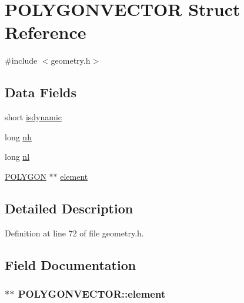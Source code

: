 \hypertarget{struct_p_o_l_y_g_o_n_v_e_c_t_o_r}{\section{P\-O\-L\-Y\-G\-O\-N\-V\-E\-C\-T\-O\-R Struct Reference}
\label{struct_p_o_l_y_g_o_n_v_e_c_t_o_r}
}


{\ttfamily \#include $<$geometry.\-h$>$}

\subsection*{Data Fields}
\begin{DoxyCompactItemize}
\item 
short \hyperlink{struct_p_o_l_y_g_o_n_v_e_c_t_o_r_a842dd05298147797db035306ce3c2424}{isdynamic}
\item 
long \hyperlink{struct_p_o_l_y_g_o_n_v_e_c_t_o_r_a13be69b5d64ab9b144901f202d9b0eb9}{nh}
\item 
long \hyperlink{struct_p_o_l_y_g_o_n_v_e_c_t_o_r_a95c31cf4ec12ed9f55ea0a6f38794bb6}{nl}
\item 
\hyperlink{struct_p_o_l_y_g_o_n}{P\-O\-L\-Y\-G\-O\-N} $\ast$$\ast$ \hyperlink{struct_p_o_l_y_g_o_n_v_e_c_t_o_r_aad9952a67bb6d320fe197a442ce362f5}{element}
\end{DoxyCompactItemize}


\subsection{Detailed Description}


Definition at line 72 of file geometry.\-h.



\subsection{Field Documentation}
\hypertarget{struct_p_o_l_y_g_o_n_v_e_c_t_o_r_aad9952a67bb6d320fe197a442ce362f5}{
\subsubsection[{element}]{$\ast$$\ast$ P\-O\-L\-Y\-G\-O\-N\-V\-E\-C\-T\-O\-R\-::element}}\label{struct_p_o_l_y_g_o_n_v_e_c_t_o_r_aad9952a67bb6d320fe197a442ce362f5}


